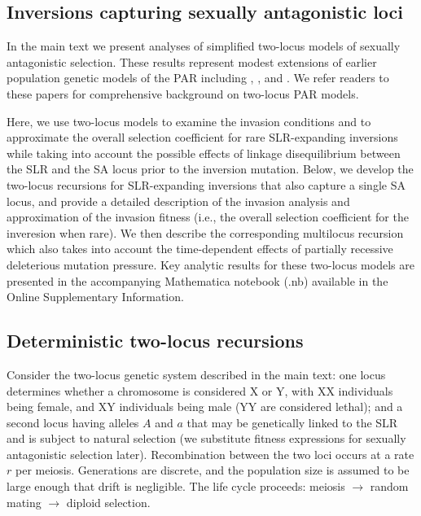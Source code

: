 \documentclass{article}
\begin{document}
\begin{appendices}
\section{Inversions capturing sexually antagonistic loci}\label{SAInvSupp}


In the main text we present analyses of simplified two-locus models of sexually antagonistic selection. These results represent modest extensions of earlier population genetic models of the PAR including \citet{Clark1987}, \citet{Otto2011}, and \citet{Otto2014, Otto2019}. We refer readers to these papers for comprehensive background on two-locus PAR models. 

Here, we use two-locus models to examine the invasion conditions and to approximate the overall selection coefficient for rare SLR-expanding inversions while taking into account the possible effects of linkage disequilibrium between the SLR and the SA locus prior to the inversion mutation. Below, we develop the two-locus recursions for SLR-expanding inversions that also capture a single SA locus, and provide a detailed description of the invasion analysis and approximation of the invasion fitness (i.e., the overall selection coefficient for the inveresion when rare). We then describe the corresponding multilocus recursion which also takes into account the time-dependent effects of partially recessive deleterious mutation pressure. Key analytic results for these two-locus models are presented in the accompanying Mathematica notebook (.nb) available in the Online Supplementary Information.


\subsection{Deterministic two-locus recursions} \label{SA-2loc-Supp}

Consider the two-locus genetic system described in the main text: one locus determines whether a chromosome is considered X or Y, with XX individuals being female, and XY individuals being male (YY are considered lethal); and a second locus having alleles $A$ and $a$ that may be genetically linked to the SLR and is subject to natural selection (we substitute fitness expressions for sexually antagonistic selection later). Recombination between the two loci occurs at a rate $r$ per meiosis. Generations are discrete, and the population size is assumed to be large enough that drift is negligible. The life cycle proceeds: meiosis $\rightarrow$ random mating $\rightarrow$ diploid selection.


\end{appendices}
\end{document}
